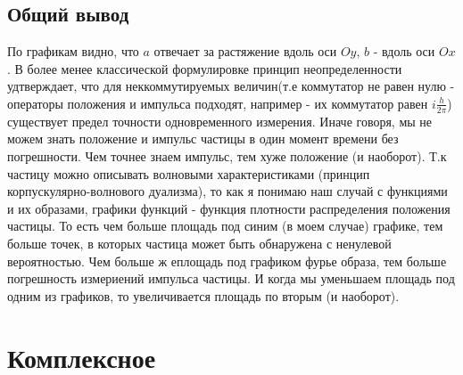     \subsection{Общий вывод}
    \noindent По графикам видно, что $a$ отвечает за растяжение вдоль оси $Oy$, $b$ - вдоль оси $Ox$. В более менее классической формулировке принцип неопределенности удтверждает, что для неккоммутируемых величин(т.е коммутатор не равен нулю - операторы положения и импульса подходят, например - их коммутатор равен $i\frac{h}{2\pi}$) существует предел точности одновременного измерения. Иначе говоря, мы не можем знать положение и импульс частицы в один момент времени без погрешности. Чем точнее знаем импульс, тем хуже положение (и наоборот).
 Т.к частицу можно описывать волновыми характеристиками (принцип
 корпускулярно-волнового дуализма), то как я понимаю наш случай с функциями и их
 образами, графики функций - функция плотности распределения положения частицы.
 То есть чем больше площадь под синим (в моем случае) графике, тем больше точек,
 в которых частица может быть обнаружена с ненулевой вероятностью.
 Чем больше ж еплощадь под графиком фурье образа, тем больше погрешность измериений импульса частицы. И когда мы уменьшаем площадь под одним из графиков, то увеличивается площадь по вторым (и наоборот).
    \section{Комплексное}
